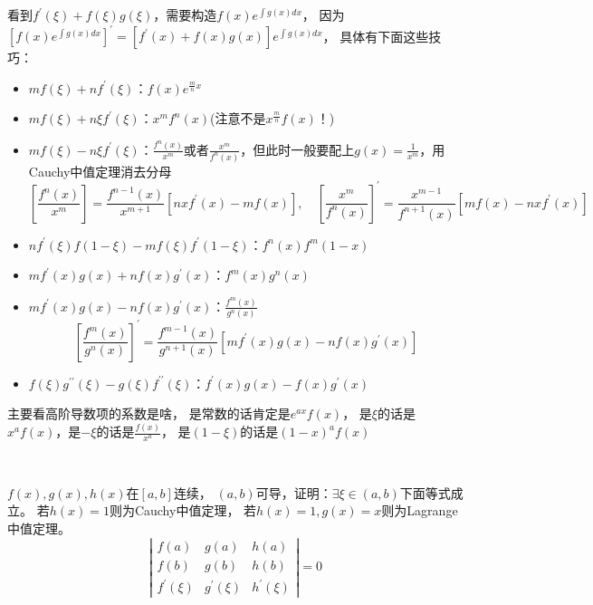 \begin{theorem}[常用中值定理辅助函数]
  看到$f^{\prime}(\xi) + f(\xi)g(\xi)$，需要构造$f(x)e^{\int g(x)dx}$，
  因为$[f(x)e^{\int g(x)dx}]^{\prime} = [f^{\prime}(x) + f(x)g(x)]e^{\int g(x)dx}$，
  具体有下面这些技巧：
  \begin{itemize}
  \item $mf(\xi) + n f^{\prime}(\xi)$：$f(x) e^{\frac{m}{n}x}$
  \item $mf(\xi) + n \xi f^{\prime}(\xi)$：$x^mf^n(x)$(注意不是$x^{\frac{m}{n}}f(x)$！)
  \item $mf(\xi) - n \xi f^{\prime}(\xi)$：$\frac{f^n(x)}{x^m}$或者$\frac{x^m}{f^n(x)}$，但此时一般要配上$g(x) = \frac{1}{x^m}$，用Cauchy中值定理消去分母
    \begin{equation*}
      \left[ \frac{f^n(x)}{x^m} \right] = \frac{f^{n-1}(x)}{x^{m+1}}[nx f^{\prime}(x) - mf(x)], \quad \left[ \frac{x^m}{f^n(x)} \right]^{\prime} = \frac{x^{m-1}}{f^{n+1}(x)}[mf(x) - nxf^{\prime}(x)]
    \end{equation*}
  \item $nf^{\prime}(\xi)f(1 - \xi) - mf(\xi)f^{\prime}(1 - \xi)$：$f^n(x)f^m(1 - x)$
  \item $m f^{\prime}(x) g(x) + n f(x) g^{\prime}(x)$：$f^m(x)g^n(x)$
  \item $mf^{\prime}(x)g(x) - n f(x)g^{\prime}(x)$：$\frac{f^m(x)}{g^n(x)}$
    \begin{equation*}
      \left[ \frac{f^m(x)}{g^n(x)} \right]^{\prime} = \frac{f^{m-1}(x)}{g^{n+1}(x)} [mf^{\prime}(x)g(x) - nf(x)g^{\prime}(x)]
    \end{equation*}
  \item $f(\xi)g^{\prime\prime}(\xi) - g(\xi) f^{\prime\prime}(\xi)$：$f^{\prime}(x)g(x) - f(x)g^{\prime}(x)$
  \end{itemize}
\end{theorem}

\begin{note}
  主要看高阶导数项的系数是啥，
  是常数的话肯定是$e^{ax}f(x)$，
  是$\xi$的话是$x^af(x)$，是$- \xi$的话是$\frac{f(x)}{x^a}$，
  是$(1 - \xi)$的话是$(1 - x)^af(x)$
\end{note}

~

\begin{exercise}[行列式求导]
  $f(x),g(x),h(x)$在$[a,b]$连续，
  $(a,b)$可导，证明：$\exists \xi \in (a,b)$下面等式成立。
  若$h(x) = 1$则为Cauchy中值定理，
  若$h(x) = 1, g(x) = x$则为Lagrange中值定理。
  \begin{equation*}
    \left|
      \begin{array}{ccc}
        f(a)&g(a)&h(a) \\
            f(b)&g(b)&h(b)\\ 
            f^{\prime}(\xi)&g^{\prime}(\xi)&h^{\prime}(\xi)
      \end{array}
    \right| = 0
  \end{equation*}
\end{exercise}

